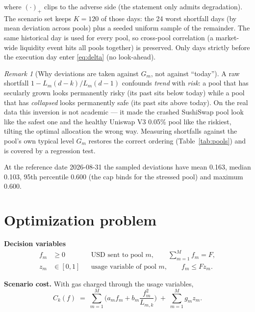 \documentclass[11pt,a4paper]{article}
\theoremstyle{remark}
\newtheorem{remark}{Remark}
\begin{document}
where $(\cdot)_+$ clips to the adverse side (the statement only admits degradation).
The scenario set keeps $K=120$ of those days: the 24 worst shortfall days (by mean
deviation across pools) plus a seeded uniform sample of the remainder.  The same historical
day is used for every pool, so cross-pool correlation (a market-wide liquidity event hits
all pools together) is preserved.  Only days strictly before the execution day enter
\eqref{eq:delta} (no look-ahead).

\begin{remark}[Why deviations are taken against $G_m$, not against ``today'']
A raw shortfall $1 - L_m(d-k)/L_m(d-1)$ confounds \emph{trend} with \emph{risk}: a pool that
has secularly grown looks permanently risky (its past sits below today) while a pool that
has \emph{collapsed} looks permanently safe (its past sits above today).  On the real data
this inversion is not academic --- it made the crashed SushiSwap pool look like the safest
one and the healthy Uniswap V3 0.05\% pool like the riskiest, tilting the optimal allocation
the wrong way.  Measuring shortfalls against the pool's own typical level $G_m$ restores the
correct ordering (Table~\ref{tab:pools}) and is covered by a regression test.
\end{remark}

At the reference date 2026-08-31 the sampled deviations have mean 0.163, median 0.103,
95th percentile 0.600 (the cap binds for the stressed pool) and maximum 0.600.

\section{Optimization problem}
\label{sec:problem}

\textbf{Decision variables}
\begin{align*}
  f_m &\ge 0 &&\text{USD sent to pool } m, \qquad \textstyle\sum_{m=1}^{M} f_m = F,\\
  z_m &\in[0,1] &&\text{usage variable of pool } m,\qquad f_m \le F z_m .
\end{align*}

\textbf{Scenario cost.}  With gas charged through the usage variables,
\begin{equation}
\label{eq:Ck}
  C_k(f) \;=\; \sum_{m=1}^{M}\Big(a_m f_m + b_m \frac{f_m^{2}}{L_{m,k}}\Big)
  \;+\; \sum_{m=1}^{M} g_m z_m .
\end{equation}
\end{document}
